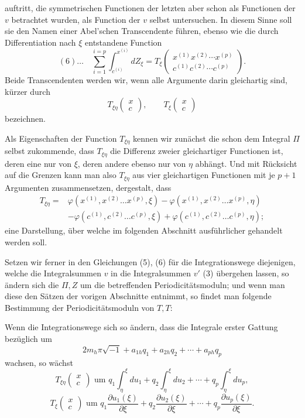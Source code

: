 \documentclass[10pt]{article}
\begin{document}
auftritt, die symmetrischen Functionen der letzten aber schon als Functionen der \(v\) betrachtet wurden, als Function der \(v\) selbst untersuchen. In diesem Sinne soll sie den Namen einer Abel'schen Transcendente führen, ebenso wie die durch Differentiation nach \(\xi\) entstandene Function
\[
(6)\ldots\quad
\sum_{i=1}^{i=p}\int_{c^{(i)}}^{x^{(i)}}dZ_\xi
=T_\xi\begin{pmatrix}x^{(1)}x^{(2)}\cdots x^{(p)}\\ c^{(1)}c^{(2)}\cdots c^{(p)}\end{pmatrix}.
\]
Beide Transcendenten werden wir, wenn alle Argumente darin gleichartig sind, kürzer durch
\[
T_{\xi\eta}\begin{pmatrix}x\\c\end{pmatrix},\qquad
T_\xi\begin{pmatrix}x\\c\end{pmatrix}
\]
bezeichnen.

Als Eigenschaften der Function \(T_{\xi\eta}\) kennen wir zunächst die schon dem Integral \(\Pi\) selbst zukommende, dass \(T_{\xi\eta}\) die Differenz zweier gleichartiger Functionen ist, deren eine nur von \(\xi\), deren andere ebenso nur von \(\eta\) abhängt. Und mit Rücksicht auf die Grenzen kann man also \(T_{\xi\eta}\) aus vier gleichartigen Functionen mit je \(p+1\) Argumenten zusammensetzen, dergestalt, dass
\[
\begin{aligned}
T_{\xi\eta}={}&\varphi(x^{(1)},x^{(2)}\ldots x^{(p)},\xi)
-\varphi(x^{(1)},x^{(2)}\ldots x^{(p)},\eta)\\
&-\varphi(c^{(1)},c^{(2)}\ldots c^{(p)},\xi)
+\varphi(c^{(1)},c^{(2)}\ldots c^{(p)},\eta);
\end{aligned}
\]
eine Darstellung, über welche im folgenden Abschnitt ausführlicher gehandelt werden soll.

Setzen wir ferner in den Gleichungen (5), (6) für die Integrationswege diejenigen, welche die Integralsummen \(v\) in die Integralsummen \(v'\) (3) übergehen lassen, so ändern sich die \(\Pi,Z\) um die betreffenden Periodicitätsmoduln; und wenn man diese den Sätzen der vorigen Abschnitte entnimmt, so findet man folgende Bestimmung der Periodicitätsmoduln von \(T,T\):

Wenn die Integrationswege sich so ändern, dass die Integrale erster Gattung bezüglich um
\[
2m_h\pi\sqrt{-1}+a_{1h}q_1+a_{2h}q_2+\cdots+a_{ph}q_p
\]
wachsen, so wächst
\[
T_{\xi\eta}\begin{pmatrix}x\\c\end{pmatrix}\text{ um }
q_1\int_\eta^\xi du_1+q_2\int_\eta^\xi du_2+\cdots+q_p\int_\eta^\xi du_p,
\]
\[
T_\xi\begin{pmatrix}x\\c\end{pmatrix}\text{ um }
q_1\frac{\partial u_1(\xi)}{\partial\xi}+q_2\frac{\partial u_2(\xi)}{\partial\xi}+\cdots+q_p\frac{\partial u_p(\xi)}{\partial\xi}.
\]
\end{document}
